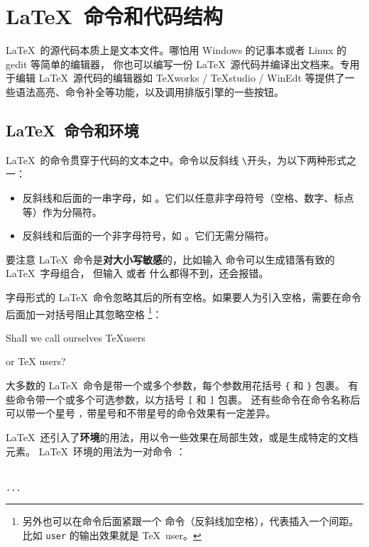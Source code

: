 \section{\LaTeX\ 命令和代码结构}\label{sec:src}

\LaTeX\ 的源代码本质上是文本文件。哪怕用 Windows 的记事本或者 Linux 的 gedit 等简单的编辑器，
你也可以编写一份 \LaTeX\ 源代码并编译出文档来。专用于编辑 \LaTeX\ 源代码的编辑器如
TeXworks / TeXstudio / WinEdt 等提供了一些语法高亮、命令补全等功能，以及调用排版引擎的一些按钮。

\subsection{\LaTeX\ 命令和环境}\label{subsec:cmds}

\LaTeX\ 的命令贯穿于代码的文本之中。命令以反斜线 \texttt\textbackslash 开头，为以下两种形式之一：
\begin{itemize}
  \item 反斜线和后面的一串字母，如 。它们以任意非字母符号（空格、数字、标点等）作为分隔符。
  \item 反斜线和后面的一个非字母符号，如 \cmd{\$}。它们无需分隔符。
\end{itemize}

要注意 \LaTeX\ 命令是\textbf{对大小写敏感}的，比如输入  命令可以生成错落有致的 \LaTeX\ 字母组合，
但输入  或者  什么都得不到，还会报错。

字母形式的 \LaTeX\ 命令忽略其后的所有空格。如果要人为引入空格，需要在命令后面加一对括号阻止其忽略空格%
\footnote{另外也可以在命令后面紧跟一个 \cmd{\textvisiblespace} 命令（反斜线加空格），代表插入一个间距。
比如 \cmd{\textvisiblespace}\-\texttt{user} 的输出效果就是 \TeX\ user。}：
\begin{example}
Shall we call ourselves 
\TeX users 

or \TeX{} users?
\end{example}

大多数的 \LaTeX\ 命令是带一个或多个参数，每个参数用花括号 \texttt\{ 和 \texttt\} 包裹。
有些命令带一个或多个可选参数，以方括号 \texttt[ 和 \texttt] 包裹。
还有些命令在命令名称后可以带一个星号 \texttt*，带星号和不带星号的命令效果有一定差异。

\LaTeX\ 还引入了\textbf{环境}的用法，用以令一些效果在局部生效，或是生成特定的文档元素。
\LaTeX\ 环境的用法为一对命令  ：
\begin{command}
 \\
\texttt{...} \\
\end{command}


